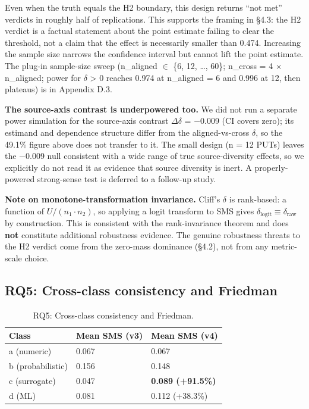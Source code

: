 \documentclass[acmsmall,screen,review]{acmart}
\begin{document}
Even when the truth equals the H2 boundary, this design returns ``not
met'' verdicts in roughly half of replications. This supports the
framing in §4.3: the H2 verdict is a factual statement about the point
estimate failing to clear the threshold, not a claim that the effect is
necessarily smaller than 0.474. Increasing the sample size narrows the
confidence interval but cannot lift the point estimate. The plug-in
sample-size sweep (n\_aligned $\in$ \{6, 12, \ldots, 60\}; n\_cross = 4 $\times$
n\_aligned; power for $\delta$ \textgreater{} 0 reaches 0.974 at n\_aligned = 6
and 0.996 at 12, then plateaus) is in Appendix D.3.

\textbf{The source-axis contrast is underpowered too.} We did not run a
separate power simulation for the source-axis contrast $\Delta\delta$ =
−0.009 (CI covers zero); its estimand and dependence structure differ
from the aligned-vs-cross $\delta$, so the 49.1\% figure above does not
transfer to it. The small design (n = 12 PUTs) leaves the −0.009 null
consistent with a wide range of true source-diversity effects, so we
explicitly do not read it as evidence that source diversity is inert. A
properly-powered strong-sense test is deferred to a follow-up study.

\textbf{Note on monotone-transformation invariance.} Cliff's $\delta$ is
rank-based: a function of $U / (n_1 \cdot n_2)$, so applying a logit transform to
SMS gives $\delta_{\mathrm{logit}} \equiv \delta_{\mathrm{raw}}$ by construction. This is consistent with the
rank-invariance theorem and does \textbf{not} constitute additional
robustness evidence. The genuine robustness threats to the H2 verdict
come from the zero-mass dominance (§4.2), not from any metric-scale
choice.

\subsection{RQ5: Cross-class consistency and Friedman}\label{rq3-cross-class-consistency-and-friedman}

{\def\LTcaptype{table} %
\begin{longtable}[]{@{}lll@{}}
\caption{RQ5: Cross-class consistency and Friedman.}\label{tab:p2-12}\\
\toprule\noalign{}
Class & Mean SMS (v3) & Mean SMS (v4) \\
\midrule\noalign{}
\endfirsthead
\endhead
\bottomrule\noalign{}
\endlastfoot
a (numeric) & 0.067 & 0.067 \\
b (probabilistic) & 0.156 & 0.148 \\
c (surrogate) & 0.047 & \textbf{0.089 (+91.5\%)} \\
d (ML) & 0.081 & 0.112 (+38.3\%) \\
\end{longtable}
}
\end{document}
